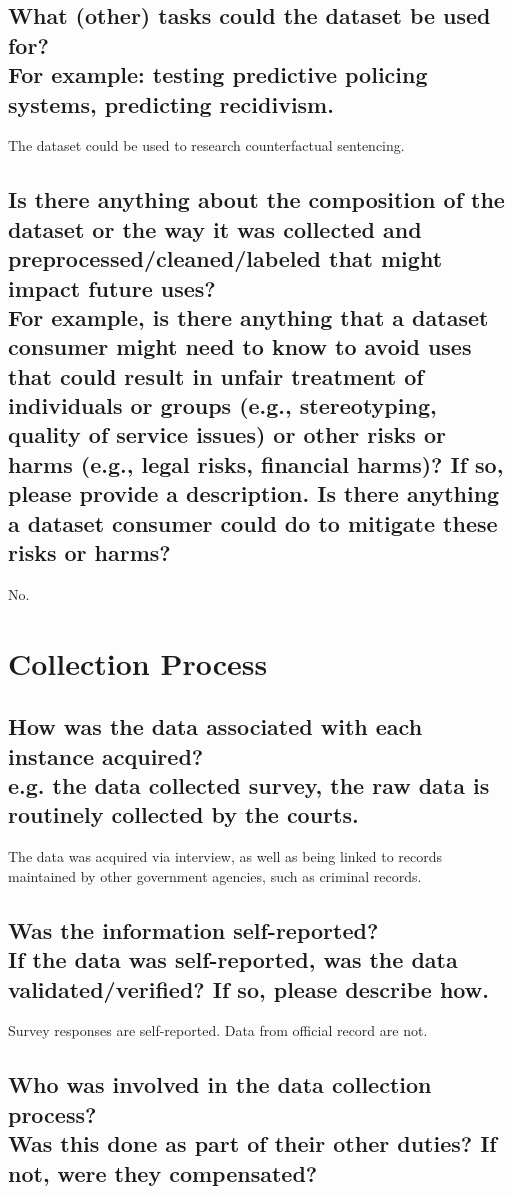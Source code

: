 \documentclass[letterpaper, 10 pt, conference]{ieeeconf}  %
\newcommand{\subtitle}[1]{{\\ \small \normalfont \color{purple} #1}}
\begin{document}
\subsection{What (other) tasks could the dataset be used for? \subtitle{For example: testing predictive policing systems, predicting recidivism.}}

The dataset could be used to research counterfactual sentencing. 

\subsection{Is there anything about the composition of the dataset or the way it was collected and preprocessed/cleaned/labeled that might impact future uses? \subtitle{For example, is there anything that a dataset consumer might need to know to avoid uses that could result in unfair treatment of individuals or groups (e.g., stereotyping, quality of service issues) or other risks or harms (e.g., legal risks, financial harms)? If so, please provide a description. Is there anything a dataset consumer could do to mitigate these risks or harms?}}

No.

\section{Collection Process}

\subsection{How was the data associated with each instance acquired? \subtitle {e.g. the data collected survey, the raw data is routinely collected by the courts.}}

The data was acquired via interview, as well as being linked to records maintained by other government agencies, such as criminal records.

\subsection{Was the information self-reported? \subtitle{If the data was self-reported, was the data validated/verified? If so, please describe how.}}

Survey responses are self-reported. Data from official record are not. 

\subsection{Who was involved in the data collection process? \subtitle{Was this done as part of their other duties? If not, were they compensated?}}
\end{document}
